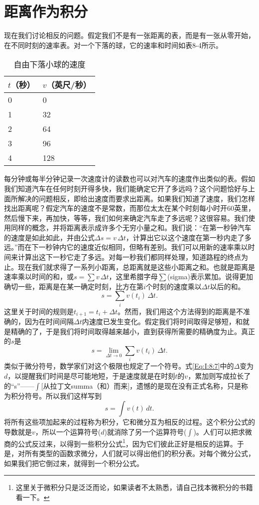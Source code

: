 \documentclass[12pt,oneside]{book}
\begin{document}
\section{距离作为积分}
现在我们讨论相反的问题。假定我们不是有一张距离的表，而是有一张从零开始，在不同时刻的速率表。对一个下落的球，它的速率和时间如表8-4所示。

\begin{table}[H]
\centering
\caption{自由下落小球的速度}
\label{tab:表8-4}
\medskip 
\begin{tabular}{@{}ll@{}}
\toprule
$t$（秒） & $v$（英尺/秒）  \\ \midrule
0  & 0  \\
1  & 32 \\
2  & 64 \\
3  & 96 \\
4  & 128 
 \\ \bottomrule
\end{tabular}
\end{table}

每分钟或每半分钟记录一次速度计的读数也可以对汽车的速度作出类似的表。假如我们知道汽车在任何时刻开得多快，我们能确定它开了多远吗？这个问题恰好与上面所解决的问题相反，即给出速度而要求出距离。如果我们知道了速度，我们怎样找出距离呢？假定汽车的速度不是常数，而那位太太在某个时刻每小时开60英里，然后慢下来，再加快，等等，我们如何来确定汽车走了多远呢？这很容易。我们使用同样的概念，并将距离表示成许多个无穷小量之和。我们说：“在第一秒钟汽车的速度是如此如此，并由公式$\Delta s=v\,\Delta t$，计算出它以这个速度在第一秒内走了多远。”而在下一秒钟内它的速度近似相同，但略有差别。我们可以用新的速率乘以时间来计算出这下一秒它走了多远。对每一秒我们都同样处理，知道路程的终点为止。现在我们就求得了一系列小距离，总距离就是这些小距离之和。也就是距离是速率乘以时间的和，或$s=\sum v\,\Delta t$，这里希腊字母$\sum$(sigma)表示累加。说得更加确切一些，距离是在某一确定时刻，比方在第$i$个时刻的速度乘以$\Delta t$以后的和。
\begin{equation}
\label{Eq:I:8:6}
s=\sum_iv(t_i)\,\Delta t.
\end{equation}
这里关于时间的规则是$t_{i+1}=t_i+\Delta t$。然而，我们用这个方法得到的距离是不准确的，因为在时间间隔$\Delta t$内速度已发生变化。假定我们将时间取得足够短，和就是精确的了，于是我们将时间取得越来越小，直到获得所需要的精确度为止。真正的$s$是
\begin{equation}
\label{Eq:I:8:7}
s=\lim_{\Delta t\to0}\sum_iv(t_i)\,\Delta t.
\end{equation}
类似于微分符号，数学家们对这个极限也规定了一个符号。式\eqref{Eq:I:8:7}中的$\Delta$变为$d$，以提醒我们时间是尽可能地短，于是速度就是在时刻$t$的$v$，累加则写成拉长了的“s”——$\int$[从拉丁文summa（和）而来]，遗憾的是现在没有正式名称，只是称为积分符号。所以我们这样写到
\begin{equation}
\label{Eq:I:8:8}
s=\int v(t)\,dt.
\end{equation}
将所有这些项加起来的过程称为积分，它和微分互为相反的过程。这个积分公式的导数就是$v$，所以一个运算符号($d$)就消除了另一个运算符号($\int$)。人们可以把求微商的公式反过来，以得到一些积分公式\footnote{这里关于微积分只是泛泛而论，如果读者不太熟悉，请自己找本微积分的书籍看一下。}，因为它们彼此正好是相反的运算。于是，对所有类型的函数求微分，人们就可以得出他们的积分表。对每个微分公式，如果我们把它倒过来，就得到一个积分公式。
\end{document}
